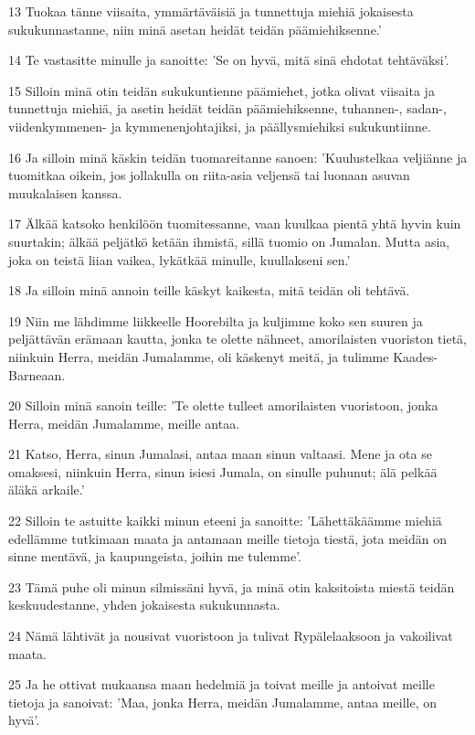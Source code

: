 \par 13 Tuokaa tänne viisaita, ymmärtäväisiä ja tunnettuja miehiä jokaisesta sukukunnastanne, niin minä asetan heidät teidän päämiehiksenne.'
\par 14 Te vastasitte minulle ja sanoitte: 'Se on hyvä, mitä sinä ehdotat tehtäväksi'.
\par 15 Silloin minä otin teidän sukukuntienne päämiehet, jotka olivat viisaita ja tunnettuja miehiä, ja asetin heidät teidän päämiehiksenne, tuhannen-, sadan-, viidenkymmenen- ja kymmenenjohtajiksi, ja päällysmiehiksi sukukuntiinne.
\par 16 Ja silloin minä käskin teidän tuomareitanne sanoen: 'Kuulustelkaa veljiänne ja tuomitkaa oikein, jos jollakulla on riita-asia veljensä tai luonaan asuvan muukalaisen kanssa.
\par 17 Älkää katsoko henkilöön tuomitessanne, vaan kuulkaa pientä yhtä hyvin kuin suurtakin; älkää peljätkö ketään ihmistä, sillä tuomio on Jumalan. Mutta asia, joka on teistä liian vaikea, lykätkää minulle, kuullakseni sen.'
\par 18 Ja silloin minä annoin teille käskyt kaikesta, mitä teidän oli tehtävä.
\par 19 Niin me lähdimme liikkeelle Hoorebilta ja kuljimme koko sen suuren ja peljättävän erämaan kautta, jonka te olette nähneet, amorilaisten vuoriston tietä, niinkuin Herra, meidän Jumalamme, oli käskenyt meitä, ja tulimme Kaades-Barneaan.
\par 20 Silloin minä sanoin teille: 'Te olette tulleet amorilaisten vuoristoon, jonka Herra, meidän Jumalamme, meille antaa.
\par 21 Katso, Herra, sinun Jumalasi, antaa maan sinun valtaasi. Mene ja ota se omaksesi, niinkuin Herra, sinun isiesi Jumala, on sinulle puhunut; älä pelkää äläkä arkaile.'
\par 22 Silloin te astuitte kaikki minun eteeni ja sanoitte: 'Lähettäkäämme miehiä edellämme tutkimaan maata ja antamaan meille tietoja tiestä, jota meidän on sinne mentävä, ja kaupungeista, joihin me tulemme'.
\par 23 Tämä puhe oli minun silmissäni hyvä, ja minä otin kaksitoista miestä teidän keskuudestanne, yhden jokaisesta sukukunnasta.
\par 24 Nämä lähtivät ja nousivat vuoristoon ja tulivat Rypälelaaksoon ja vakoilivat maata.
\par 25 Ja he ottivat mukaansa maan hedelmiä ja toivat meille ja antoivat meille tietoja ja sanoivat: 'Maa, jonka Herra, meidän Jumalamme, antaa meille, on hyvä'.
